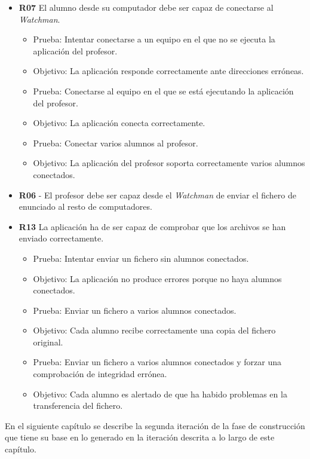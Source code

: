 \begin{itemize}


    \item {\bfseries R07} El alumno desde su computador debe ser capaz de conectarse al \emph{Watchman}.

    \begin{itemize}
        \item Prueba: Intentar conectarse a un equipo en el que no se ejecuta la aplicación del profesor.
        \item Objetivo: La aplicación responde correctamente ante direcciones erróneas.
        \newline

        \item Prueba: Conectarse al equipo en el que se está ejecutando la aplicación del profesor.
        \item Objetivo: La aplicación conecta correctamente.
        \newline

        \item Prueba: Conectar varios alumnos al profesor.
        \item Objetivo: La aplicación del profesor soporta correctamente varios alumnos conectados.

    \end{itemize}

    \item {\bfseries R06} -  El profesor debe ser capaz desde el \emph{Watchman} de enviar el fichero de enunciado al resto de computadores.
        \newline

    \item  {\bfseries R13} La aplicación ha de ser capaz de comprobar que los archivos se han enviado correctamente.

    \begin{itemize}

        \item Prueba: Intentar enviar un fichero sin alumnos conectados.
        \item Objetivo: La aplicación no produce errores porque no haya alumnos conectados.
        \newline

        \item Prueba: Enviar un fichero a varios alumnos conectados.
        \item Objetivo: Cada alumno recibe correctamente una copia del fichero original.
        \newline

        \item Prueba: Enviar un fichero a varios alumnos conectados y forzar una comprobación de integridad errónea.
        \item Objetivo: Cada alumno es alertado de que ha habido problemas en la transferencia del fichero.

    \end{itemize}

\end{itemize}


En el siguiente capítulo se describe la segunda iteración de la fase de construcción que tiene su base en lo generado en la iteración descrita a lo largo de este capítulo.

